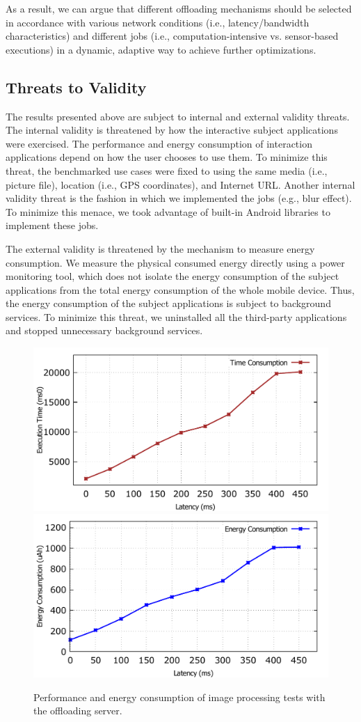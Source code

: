 \documentclass{sig-alternate}
\begin{document}
As a result, we can argue that different offloading mechanisms should be selected in accordance with various network conditions (i.e., latency/bandwidth characteristics) and different jobs (i.e., computation-intensive vs. sensor-based executions) in a dynamic, adaptive way to achieve further optimizations. 

\subsection{Threats to Validity}
The results presented above are subject to internal and external validity threats. The internal validity is threatened by how the interactive subject applications were exercised. The performance and energy consumption of interaction applications depend on how the user chooses to use them. To minimize this threat, the benchmarked use cases were fixed to using the same media (i.e., picture file), location (i.e., GPS coordinates), and Internet URL. Another internal validity threat is the fashion in which we implemented the jobs (e.g., blur effect). To minimize this menace, we took advantage of built-in Android libraries to implement these jobs.

The external validity is threatened by the mechanism to measure energy consumption. We measure the physical consumed energy directly using a power monitoring tool, which does not isolate the energy consumption of the subject applications from the total energy consumption of the whole mobile device. Thus, the energy consumption of the subject applications is subject to background services. To minimize this threat, we uninstalled all the third-party applications and stopped unnecessary background services.

\begin{figure}
	\centering
		\includegraphics[width=.42\textwidth]{data/off_multi_perf.pdf}
		\includegraphics[width=.42\textwidth]{data/off_multi_energy.pdf}
	\caption{Performance and energy consumption of image processing tests with the offloading server.}
	\label{fig:off_all}
\end{figure}
\end{document}
